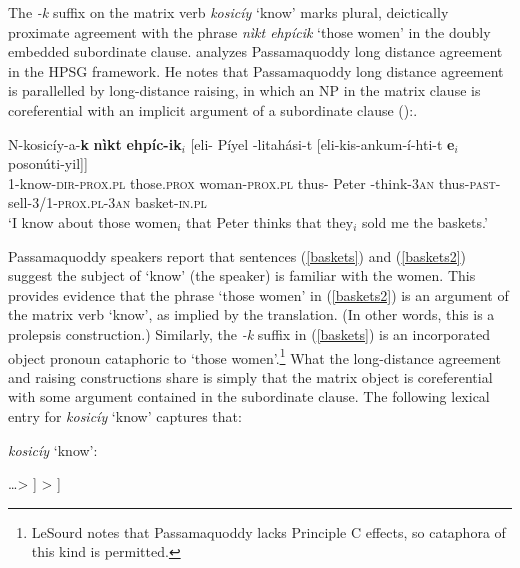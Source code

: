 \documentclass[output=paper]{langsci/langscibook}
\begin{document}
\noindent
The \textit{-k} suffix on the matrix verb \textit{kosic\'{i}y} `know' marks plural, deictically proximate agreement with the phrase \textit{n\`{i}kt ehp\'{i}cik} `those women'  in the doubly embedded subordinate clause.  \citet{LeSourd:2018} analyzes Passamaquoddy long distance agreement in the HPSG framework.   He notes that  Passamaquoddy long distance agreement is parallelled by long-distance raising, in which an NP in the matrix clause is coreferential with an implicit argument of a subordinate clause (\citet[ex. 4]{LeSourd:2018}):.  

\begin{exe}
\ex\label{baskets2}
\gll 	N-kosic\'{i}y-a-\textbf{k} \textbf{n\`{i}kt}  \textbf{ehp\'{i}c-ik}$_i$ [eli- P\'{i}yel -litah\'{a}si-t  [eli-kis-ankum-\'{i}-hti-t  \textbf{e$_i$} 	poson\'{u}ti-yil]] \\
1-know-\textsc{dir-prox.pl} those.\textsc{prox}  woman-\textsc{prox.pl}   thus- Peter -think-\textsc{3an} thus-\textsc{past}-sell-\textsc{3/1-prox.pl-3an}         {}    basket-\textsc{in.pl}\\
\glt ‘I know about those women$_i$ that Peter thinks that they$_i$ sold me the baskets.’
\end{exe}

\noindent
Passamaquoddy speakers report that sentences (\ref{baskets}) and (\ref{baskets2}) suggest the subject of `know' (the speaker) is familiar with the women.  This provides evidence that the phrase `those women' in (\ref{baskets2}) is an argument of the matrix verb `know', as implied by the translation.  (In other words, this is a prolepsis construction.)  Similarly, the \textit{-k} suffix in (\ref{baskets}) is an incorporated object pronoun cataphoric to `those women'.\footnote{LeSourd notes that Passamaquoddy lacks Principle C effects, so cataphora of this kind is permitted.}  What the long-distance agreement and raising constructions share is simply that the matrix object is coreferential with some argument contained in the subordinate clause.  The following lexical entry for \textit{kosic\'{i}y} `know' captures that:

 \begin{exe}
\ex\label{know}
\textit{kosic\'{i}y} `know': \\
\begin{avm}
[ phon &  < $kosic\'{i}y$ >  \\
arg-st & <  np$_i$ , np$_j$ , s:[restr  < \ldots [prd|arg & $j$ ] \ldots > ] > ] 
\end{avm}  
\end{exe}
\end{document}
